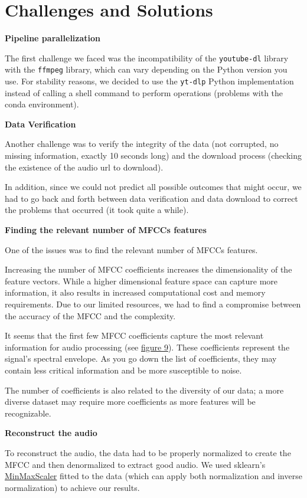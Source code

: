 \documentclass[11pt]{article}
\begin{document}
\pagebreak

\section{Challenges and Solutions}
\textbf{Pipeline parallelization}

The first challenge we faced was the incompatibility of the \texttt{youtube-dl} library with the \texttt{ffmpeg} library, which can vary depending on the Python version you use.
For stability reasons, we decided to use the \texttt{yt-dlp} Python implementation instead of calling a shell command to perform operations (problems with the conda environment).

\textbf{Data Verification}

Another challenge was to verify the integrity of the data (not corrupted, no missing information, exactly 10 seconds long) and the download process (checking the existence of the audio url to download).

In addition, since we could not predict all possible outcomes that might occur, we had to go back and forth between data verification and data download to correct the problems that occurred (it took quite a while).

\textbf{Finding the relevant number of MFCCs features}

One of the issues was to find the relevant number of MFCCs features.

Increasing the number of MFCC coefficients increases the dimensionality of the feature vectors. While a higher dimensional feature space can capture more information, it also results in increased computational cost and memory requirements. Due to our limited resources, we had to find a compromise between the accuracy of the MFCC and the complexity.

It seems that the first few MFCC coefficients capture the most relevant information for audio processing (see \hyperref[fig:MFCC_piano]{figure 9}). These coefficients represent the signal's spectral envelope. As you go down the list of coefficients, they may contain less critical information and be more susceptible to noise.

The number of coefficients is also related to the diversity of our data; a more diverse dataset may require more coefficients as more features will be recognizable.

\textbf{Reconstruct the audio}

To reconstruct the audio, the data had to be properly normalized to create the MFCC and then denormalized to extract good audio. We used sklearn's \href{https://scikit-learn.org/stable/modules/generated/sklearn.preprocessing.MinMaxScaler.html}{MinMaxScaler} fitted to the data (which can apply both normalization and inverse normalization) to achieve our results.
\end{document}
